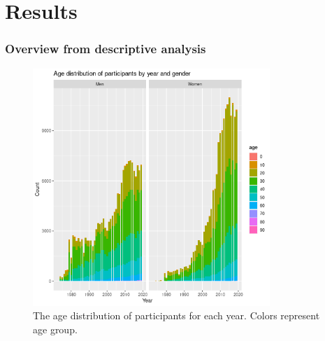 \documentclass[12pt]{article}
\begin{document}
\section*{Results}

\subsubsection*{Overview from descriptive analysis}


\begin{figure}[ht]
	\centering
	\includegraphics[width = 0.8\textwidth]
	{../figure/descriptive_stat-1.png}
	\caption{
		The age distribution of participants for each year.
		Colors represent age group.
	}
	\label{age-dist}
\end{figure}

\end{document}
